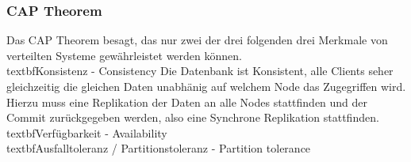 \begin{table}[]
\caption{Quorum Beispiele}
\label{tab:quorum-beispiele}
\end{table}
\subsubsection{CAP Theorem}
Das CAP Theorem besagt, das nur zwei der drei folgenden drei Merkmale von verteilten Systeme gewährleistet werden können\cite{EE6EQHU2}.
\\textbf{Konsistenz - Consistency}
Die Datenbank ist Konsistent, alle Clients seher gleichzeitig die gleichen Daten unabhänig auf welchem Node das Zugegriffen wird.
Hierzu muss eine Replikation der Daten an alle Nodes stattfinden und der Commit zurückgegeben werden, also eine Synchrone Replikation stattfinden.
\\textbf{Verfügbarkeit - Availability}
\\textbf{Ausfalltoleranz / Partitionstoleranz - Partition tolerance}

